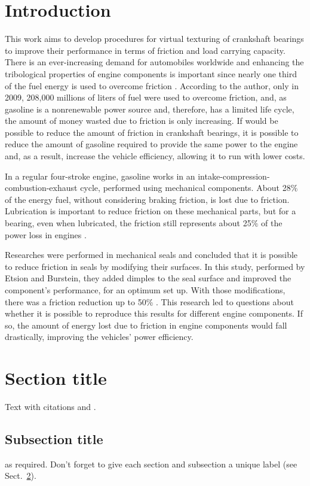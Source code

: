 \section{Introduction}
\label{intro}
This work aims to develop procedures for virtual texturing of crankshaft bearings to improve their performance in terms of friction and load carrying capacity. There is an ever-increasing demand for automobiles worldwide and enhancing the tribological properties of engine components is important since nearly one third of the fuel energy is used to overcome friction \cite{Holmberg2012}. According to the author, only in 2009, 208,000 millions of liters of fuel were used to overcome friction, and, as gasoline is a nonrenewable power source and, therefore, has a limited life cycle, the amount of money wasted due to friction is only increasing. If would be possible to reduce the amount of friction in crankshaft bearings, it is possible to reduce the amount of gasoline required to provide the same power to the engine and, as a result,  increase the vehicle efficiency, allowing it to run with lower costs.

In a regular four-stroke engine, gasoline works in an intake-compression-combustion-exhaust cycle, performed using mechanical components. About 28$\%$ of the energy fuel, without considering braking friction, is lost due to friction. Lubrication is important to reduce friction on these mechanical parts, but for a bearing, even when lubricated, the friction still represents about 25$\%$ of the power loss in engines \cite{Ligier2015}.      

Researches were performed in mechanical seals and concluded that it is possible to reduce friction in seals by modifying their surfaces. In this study, performed by Etsion and Burstein, they added dimples to the seal surface and improved the component's performance, for an optimum set up. With those modifications, there was a friction reduction up to 50\% \cite{Etsion1996}. This research led to questions about whether it is possible to reproduce this results for different engine components. If so, the amount of energy lost due to friction in engine components would fall drastically, improving the vehicles' power efficiency.

\section{Section title}
\label{sec:1}
Text with citations \cite{RefB} and \cite{RefJ}.
\subsection{Subsection title}
\label{sec:2}
as required. Don't forget to give each section
and subsection a unique label (see Sect.~\ref{sec:1}).
